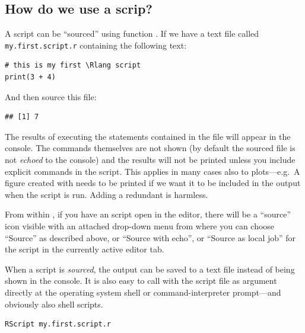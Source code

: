 \documentclass[krantz2]{krantz}\usepackage{knitr}%
\begin{document}
\subsection{How do we use a scrip?}\label{sec:script:using}

A script can be ``sourced'' using function . If we have a text file called \texttt{my.first.script.r} containing the following text:
\begin{shaded}
\footnotesize
\begin{verbatim}
# this is my first \Rlang script
print(3 + 4)
\end{verbatim}
\end{shaded}

And then source this file:

\begin{knitrout}\footnotesize
{}\color{fgcolor}\begin{kframe}
\begin{alltt}
\hlstd{(}\hlstd{)}
\end{alltt}
\begin{verbatim}
## [1] 7
\end{verbatim}
\end{kframe}
\end{knitrout}

The results of executing the statements contained in the file will appear in the console. The commands themselves are not shown (by default the sourced file is not \emph{echoed} to the console) and the results will not be printed unless you include explicit  commands in the script. This applies in many cases also to plots---e.g.\ A figure created with  needs to be printed if we want it to be included in the output when the script is run. Adding a redundant  is harmless.

From within \RStudio, if you have an \Rpgrm script open in the editor, there will be a ``source'' icon visible with an attached drop-down menu from where you can choose ``Source'' as described above, or ``Source with echo'', or ``Source as local job'' for the script in the currently active editor tab.

When a script is \emph{sourced}, the output can be saved to a text file instead of being shown in the console. It is also easy to call \Rpgrm with the script file as argument directly at the operating system shell or command-interpreter prompt---and obviously also shell scripts.
\begin{shaded}
\footnotesize
\begin{verbatim}
RScript my.first.script.r
\end{verbatim}
\end{shaded}
\end{document}
